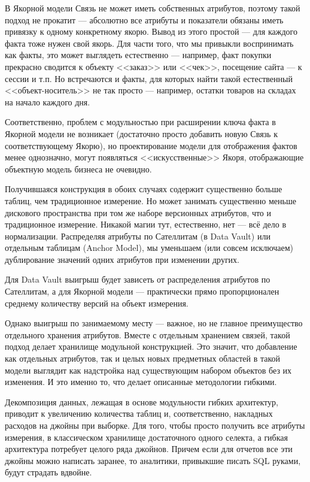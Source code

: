 \documentclass[%
	11pt,
	a4paper,
	utf8,
		]{article}
\begin{document}
В Якорной модели Связь не может иметь собственных атрибутов, поэтому такой подход не прокатит — абсолютно все атрибуты и показатели обязаны иметь привязку к одному конкретному якорю. Вывод из этого простой — для каждого факта тоже нужен свой якорь. Для части того, что мы привыкли воспринимать как факты, это может выглядеть естественно — например, факт покупки прекрасно сводится к объекту <<заказ>> или <<чек>>, посещение сайта — к сессии и т.п. Но встречаются и факты, для которых найти такой естественный <<объект-носитель>> не так просто — например, остатки товаров на складах на начало каждого дня.

Соответственно, проблем с модульностью при расширении ключа факта в Якорной модели не возникает (достаточно просто добавить новую Связь к соответствующему Якорю), но проектирование модели для отображения фактов менее однозначно, могут появляться <<искусственные>> Якоря, отображающие объектную модель бизнеса не очевидно.

Получившаяся конструкция в обоих случаях содержит существенно больше таблиц, чем традиционное измерение. Но может занимать существенно меньше дискового пространства при том же наборе версионных атрибутов, что и традиционное измерение. Никакой магии тут, естественно, нет — всё дело в нормализации. Распределяя атрибуты по Сателлитам (в Data Vault) или отдельным таблицам (Anchor Model), мы уменьшаем (или совсем исключаем) дублирование значений одних атрибутов при изменении других.

Для Data Vault выигрыш будет зависеть от распределения атрибутов по Сателлитам, а для Якорной модели — практически прямо пропорционален среднему количеству версий на объект измерения.

Однако выигрыш по занимаемому месту — важное, но не главное преимущество отдельного хранения атрибутов. Вместе с отдельным хранением связей, такой подход делает хранилище модульной конструкцией. Это значит, что добавление как отдельных атрибутов, так и целых новых предметных областей в такой модели выглядит как надстройка над существующим набором объектов без их изменения. И это именно то, что делает описанные методологии гибкими.

Декомпозиция данных, лежащая в основе модульности гибких архитектур, приводит к увеличению количества таблиц и, соответственно, накладных расходов на джойны при выборке. Для того, чтобы просто получить все атрибуты измерения, в классическом хранилище достаточного одного селекта, а гибкая архитектура потребует целого ряда джойнов. Причем если для отчетов все эти джойны можно написать заранее, то аналитики, привыкшие писать SQL руками, будут страдать вдвойне.
\end{document}

